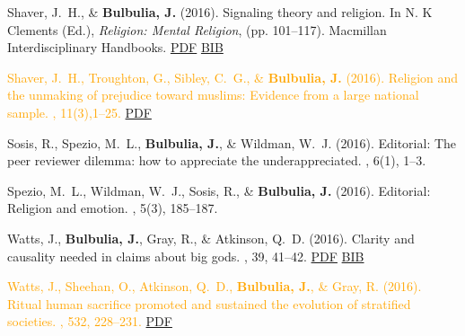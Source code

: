 \documentclass{article}
\begin{document}
\begin{thebibliography}{99}
Shaver, J.~H., \& {\bf Bulbulia, J.} (2016).
\newblock Signaling theory and religion.
\newblock In N. K Clements (Ed.), {\em Religion: Mental Religion}, (pp. 101--117). Macmillan
  Interdisciplinary Handbooks. 
\href{https://www.dropbox.com/s/3csna1dy4vbib92/Signaling_Theory_and_Religion.pdf?dl=0}{PDF} \href{https://www.dropbox.com/s/p4b2hzshwuk2q9u/2016.Sh.bul.STR.bib?dl=0}{BIB}


\textcolor{Orange}{Shaver, J.~H., Troughton, G., Sibley, C.~G., \& {\bf Bulbulia, J.} (2016).
\newblock Religion and the unmaking of prejudice toward muslims: Evidence from
  a large national sample.
, 11(3),1--25.}
\href{https://www.dropbox.com/s/jw4r962hchojfvr/journal.pone.0150209.PDF?dl=0}{PDF} %


Sosis, R., Spezio, M.~L., {\bf Bulbulia, J.}, \& Wildman, W.~J. (2016). Editorial:
\newblock The peer reviewer dilemma: how to appreciate the underappreciated.
, 6(1), 1--3. 


Spezio, M.~L., Wildman, W.~J., Sosis, R., \& {\bf Bulbulia, J.} (2016). Editorial: 
\newblock Religion and emotion.
, 5(3), 185--187.


Watts, J., {\bf Bulbulia, J.}, Gray, R., \& Atkinson, Q.~D. (2016).
\newblock Clarity and causality needed in claims about big gods.
, 39, 41--42.
\href{https://www.dropbox.com/s/xag576vua0i80gq/2016WattsBBSResponseBigGods.pdf?dl=0}{PDF} \href{https://www.dropbox.com/s/71veqhxsq84ufao/wattsEtAl.2016.BigGodsResponse.bib?dl=0}{BIB}


\textcolor{Orange}{Watts, J., Sheehan, O., Atkinson, Q.~D., {\bf Bulbulia, J.}, \& Gray, R. (2016).
\newblock Ritual human sacrifice promoted and sustained the evolution of
  stratified societies.
, 532, 228--231.}
\href{https://www.dropbox.com/s/e5avan4ex1nkgi6/nature17159.pdf?dl=0}{PDF}




\end{thebibliography}
\end{document}
